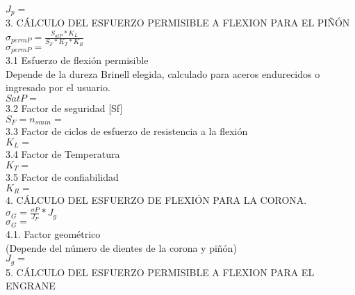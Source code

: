 \documentclass[a4paper,9pt,vertical]{article}
\begin{document}
\begin{multicols}{2}
    $J_p =  $\\
    
    3.  CÁLCULO DEL ESFUERZO PERMISIBLE A FLEXION PARA EL PIÑÓN\\
    
    $\sigma_{permP} = \frac{S_{atP}*K_L}{S_F*K_T*K_R}$\\
    $\sigma_{permP} =  $\\
    

    3.1	 Esfuerzo de flexión permisible\\
    
    Depende de la dureza Brinell elegida, calculado para aceros endurecidos o ingresado por el usuario.\\
    
    $SatP =  $\\
    
    
    3.2  Factor de seguridad [Sf]\\
    
    $S_F = n_{smin} =  $\\
    
    3.3	 Factor de ciclos de esfuerzo de resistencia a la flexión\\

    $ K_L =  $\\
    
    3.4	 Factor de Temperatura\\

    $K_T  = $\\
    
    3.5	 Factor de confiabilidad\\

    $K_R =  $\\
    
    4.	CÁLCULO DEL ESFUERZO DE FLEXIÓN PARA LA CORONA.\\
    
    $\sigma_G = \frac{\sigma P}{J_P}*J_g$\\
    $\sigma_G =  $\\
    
    4.1.	Factor geométrico \\
    (Depende del número de dientes de la corona y piñón)\\
    
    $J_g =  $\\
    
    5.	CÁLCULO DEL ESFUERZO PERMISIBLE A FLEXION PARA EL ENGRANE\\
    

\end{multicols}
\end{document}

